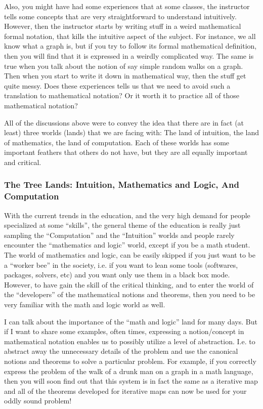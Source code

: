 \documentclass[10pt,a4paper]{article}
\begin{document}
	
\medskip
Also, you might have had some experiences that at some classes, the instructor tells some concepts that are very straightforward to understand intuitively. However, then the instructor starts by writing stuff in a weird mathematical formal notation, that kills the intuitive aspect of the subject. For instance, we all know what a graph is, but if you try to follow its formal mathematical definition, then you will find that it is expressed in a weirdly complicated way. The same is true when you talk about the notion of say simple random walks on a graph. Then when you start to write it down in mathematical way, then the stuff get quite messy.  Does these experiences tells us that we need to avoid such a translation to mathematical notation? Or it worth it to practice all of those mathematical notation?


\medskip
All of the discussions above were to convey the idea that there are in fact (at least) three worlds (lands) that we are facing with: The land of intuition, the land of mathematics, the land of computation. Each of these worlds has some important feathers that others do not have, but they are all equally important and critical.

\subsubsection*{The Tree Lands: Intuition, Mathematics and Logic, And Computation}

With the current trends in the education, and the very high demand for people specialized at some ``skills'', the general theme of the education is really just sampling the ``Computation'' and the ``Intuition'' worlds and people rarely encounter the ``mathematics and logic'' world, except if you be a math student. The world of mathematics and logic, can be easily skipped if you just want to be a ``worker bee'' in the society, i.e. if you want to lean some tools (softwares, packages, solvers, etc) and you want only use them in a black box mode. However, to have gain the skill of the critical thinking, and to enter the world of the ``developers'' of the mathematical notions and theorems, then you need to be very familiar with the math and logic world as well.


\medskip
I can talk about the importance of the ``math and logic'' land for many days. But if I want to share some examples, often times, expressing a notion/concept in mathematical notation enables us to possibly utilize a level of abstraction. I.e. to abstract away the unnecessary details of the problem and use the canonical notions and theorems to solve a particular problem. For example, if you correctly express the problem of the walk of a drunk man on a graph in a math language, then you will soon find out that this system is in fact the same as a iterative map and all of the theorems developed for iterative maps can now be used for your oddly sound problem!
\medskip
\end{document}

